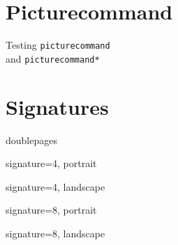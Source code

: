 \documentclass[a4paper]{article}
\begin{document}
\section{Picturecommand}
\begingroup
Testing \texttt{picturecommand}\\ and \texttt{picturecommand*}

\endgroup


\section{Signatures}
\begingroup
doublepages

signature=4, portrait

signature=4, landscape

signature=8, portrait

signature=8, landscape

\endgroup
\end{document}
